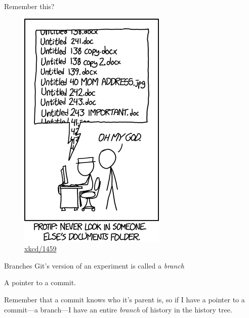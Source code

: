 \documentclass{beamer}
\theoremstyle{example}
\newcommand{\xkcd}[1]{\href{https://xkcd.com/#1}{xkcd/#1}}
\begin{document}
\begin{frame}{Remember this?}
    \begin{figure}
        \includegraphics[scale=0.4]{img/documents}
        \caption{\xkcd{1459}}
    \end{figure}
\end{frame}

\begin{frame}{Branches}
    Git's version of an experiment is called a \emph{branch}

    \begin{definition}[Branch]
        A pointer to a commit.
    \end{definition}

    Remember that a commit knows who it's parent is, so if I have a pointer to a
    commit---a branch---I have an entire \emph{branch} of history in the history
    tree.
\end{frame}
\end{document}
